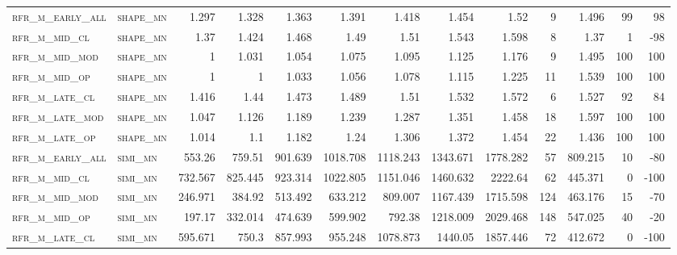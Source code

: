 \begin{landscape}
\begin{center}
\begin{footnotesize}
\begin{longtable}{llrrrrrrrr|rrr}
\textsc{rfr\_m\_early\_all} & \textsc{shape\_mn }   & 1.297   & 1.328   & 1.363   & 1.391    & 1.418    & 1.454    & 1.52     & 9      & 1.496         & 99            & 98              \\
\textsc{rfr\_m\_mid\_cl   } & \textsc{shape\_mn }   & 1.37    & 1.424   & 1.468   & 1.49     & 1.51     & 1.543    & 1.598    & 8      & 1.37          & 1             & -98             \\
\textsc{rfr\_m\_mid\_mod  } & \textsc{shape\_mn }   & 1       & 1.031   & 1.054   & 1.075    & 1.095    & 1.125    & 1.176    & 9      & 1.495         & 100           & 100             \\
\textsc{rfr\_m\_mid\_op   } & \textsc{shape\_mn }   & 1       & 1       & 1.033   & 1.056    & 1.078    & 1.115    & 1.225    & 11     & 1.539         & 100           & 100             \\
\textsc{rfr\_m\_late\_cl  } & \textsc{shape\_mn }   & 1.416   & 1.44    & 1.473   & 1.489    & 1.51     & 1.532    & 1.572    & 6      & 1.527         & 92            & 84              \\
\textsc{rfr\_m\_late\_mod } & \textsc{shape\_mn }   & 1.047   & 1.126   & 1.189   & 1.239    & 1.287    & 1.351    & 1.458    & 18     & 1.597         & 100           & 100             \\
\textsc{rfr\_m\_late\_op  } & \textsc{shape\_mn }   & 1.014   & 1.1     & 1.182   & 1.24     & 1.306    & 1.372    & 1.454    & 22     & 1.436         & 100           & 100             \\
\textsc{rfr\_m\_early\_all} & \textsc{simi\_mn  }   & 553.26  & 759.51  & 901.639 & 1018.708 & 1118.243 & 1343.671 & 1778.282 & 57     & 809.215       & 10            & -80             \\
\textsc{rfr\_m\_mid\_cl   } & \textsc{simi\_mn  }   & 732.567 & 825.445 & 923.314 & 1022.805 & 1151.046 & 1460.632 & 2222.64  & 62     & 445.371       & 0             & -100            \\
\textsc{rfr\_m\_mid\_mod  } & \textsc{simi\_mn  }   & 246.971 & 384.92  & 513.492 & 633.212  & 809.007  & 1167.439 & 1715.598 & 124    & 463.176       & 15            & -70             \\
\textsc{rfr\_m\_mid\_op   } & \textsc{simi\_mn  }   & 197.17  & 332.014 & 474.639 & 599.902  & 792.38   & 1218.009 & 2029.468 & 148    & 547.025       & 40            & -20             \\
\textsc{rfr\_m\_late\_cl  } & \textsc{simi\_mn  }   & 595.671 & 750.3   & 857.993 & 955.248  & 1078.873 & 1440.05  & 1857.446 & 72     & 412.672       & 0             & -100            \\

\end{longtable}
\end{footnotesize}
\end{center}
\end{landscape}
